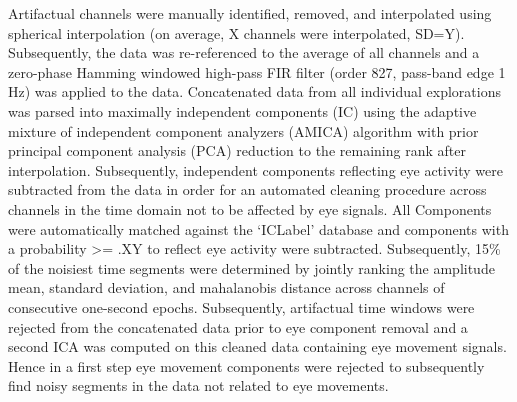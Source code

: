 \begin{comment}
To study event-related potentials, a 0.1 Hz to 40 Hz filter was applied  and eye components as well as line noise components were projected out, again with component labeling using ICLabel (both thresholds set to 0.8). The continuous data streams were then epoched from 1200 ms pre-target stimuls (200ms before reference stimulus) to 1200 ms post-target stimulus presentation. Automatic epoch cleaning was applied using the same procedure as described above, rejecting 10\% of the noisiest epochs.
All epochs containing mismatch trials, incorrect responses, as well as reaction times exceeding two standard deviations (sd) from participants mean reaction time in the respective difficulty level, were excluded from further analysis on EEG and behavioral level. The same procedures were applied to create longer epochs up to 6000 ms post-target stimulus in order to properly plot the ERP Image \cite{delorme2015grand} sorted by reaction times. (check number of remaining trials etc and add here)
\end{comment}

Artifactual channels were manually identified, removed, and interpolated using spherical interpolation (on average, X channels were interpolated, SD=Y). Subsequently, the data was re-referenced to the average of all channels and a zero-phase Hamming windowed high-pass FIR filter (order 827, pass-band edge 1 Hz) was applied to the data. Concatenated data from all individual explorations was parsed into maximally independent components (IC) using the adaptive mixture of independent component analyzers (AMICA) algorithm with prior principal component analysis (PCA) reduction to the remaining rank after interpolation\citep{Palmer2011}. Subsequently, independent components reflecting eye activity were subtracted from the data in order for an automated cleaning procedure across channels in the time domain not to be affected by eye signals. All Components were automatically matched against the ‘ICLabel’ database and components with a probability >= .XY to reflect eye activity were subtracted\citep{iclabel}. Subsequently, 15\% of the noisiest time segments were determined by jointly ranking the amplitude mean, standard deviation, and mahalanobis distance across channels of consecutive one-second epochs\citep{cleaning_fh2018}. Subsequently, artifactual time windows were rejected from the concatenated data prior to eye component removal and a second ICA was computed on this cleaned data containing eye movement signals. Hence in a first step eye movement components were rejected to subsequently find noisy segments in the data not related to eye movements.

